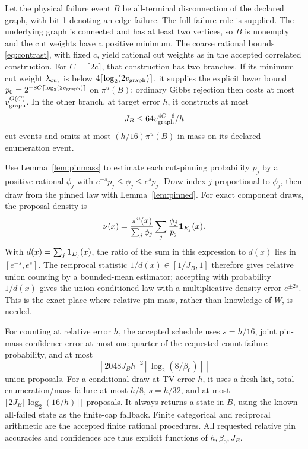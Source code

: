 Let the physical failure event $B$ be all-terminal disconnection of the
declared graph, with bit 1 denoting an edge failure. The full failure rule
is supplied. The underlying graph is connected and has at least two
vertices, so $B$ is nonempty and the cut weights have a positive minimum.
The coarse rational bounds \eqref{eq:contrast}, with fixed
$c$, yield rational cut weights as in the accepted correlated construction.
For $C=\lceil2c\rceil$, that construction has two branches.
If its minimum cut weight $\lambda_{\rm cut}$ is below
$4\lceil\log_2(2v_{\rm graph})\rceil$, it supplies the explicit lower bound
$p_0=2^{-8C\lceil\log_2(2v_{\rm graph})\rceil}$ on $\pi^u(B)$; ordinary
Gibbs rejection then costs at most $v_{\rm graph}^{O(C)}$.
In the other branch, at target error $h$, it constructs at most
\[
 J_B\le64v_{\rm graph}^{4C+6}/h
\]
cut events and omits at most $(h/16)\pi^u(B)$ in mass on its declared
enumeration event.

Use Lemma~\ref{lem:pinmass} to estimate each cut-pinning probability $p_j$
by a positive rational $\phi_j$ with
$e^{-s}p_j\le\phi_j\le e^sp_j$. Draw index $j$ proportional to $\phi_j$,
then draw from the pinned law with Lemma~\ref{lem:pinned}. For exact
component draws, the proposal density is
\[
 \nu(x)=\frac{\pi^u(x)}{\sum_j\phi_j}
       \sum_j\frac{\phi_j}{p_j}\mathbf 1_{E_j}(x).
\]
With $d(x)=\sum_j\mathbf 1_{E_j}(x)$, the ratio of the sum in this expression
to $d(x)$ lies in $[e^{-s},e^s]$.
The reciprocal statistic $1/d(x)\in[1/J_B,1]$ therefore gives relative
union counting by a bounded-mean estimator; accepting with probability
$1/d(x)$ gives the union-conditioned law with a multiplicative density
error $e^{\pm2s}$. This is the exact place where relative pin mass,
rather than knowledge of $W$, is needed.

For counting at relative error $h$, the accepted schedule uses
$s=h/16$, joint pin-mass confidence error at most one quarter of the
requested count failure probability, and at most
\[
 \left\lceil2048J_Bh^{-2}\left\lceil\log_2(8/\beta_0)\right\rceil\right\rceil
\]
union proposals.
For a conditional draw at TV error $h$, it uses a fresh list, total
enumeration/mass failure at most $h/8$, $s=h/32$, and at most
$\lceil2J_B\lceil\log_2(16/h)\rceil\rceil$ proposals. It always returns
a state in $B$, using the known all-failed state as the finite-cap fallback.
Finite categorical and reciprocal arithmetic are the accepted finite
rational procedures. All requested relative pin accuracies and confidences
are thus explicit functions of $h,\beta_0,J_B$.

